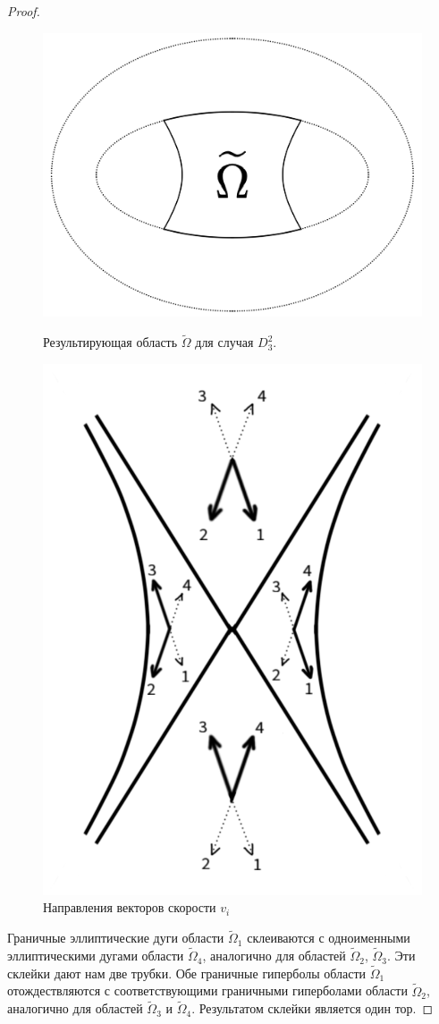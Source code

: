 \begin{proof}
\begin{figure}[!htb]
\centering
\includegraphics[width=0.8\linewidth]{images/section2/hyp_domain_example.pdf}
    \caption{Результирующая область $\widetilde{\Omega}$ для случая $D_3^2$.}
    \label{fig:pt9:_hyp_domain_example}
\endminipage\hfill
{}
\centering
\includegraphics[width=0.65\linewidth]{images/section2/hyp_vectors_numbering.pdf}
    \caption{Направления векторов скорости $v_i$}
    \label{fig:pt9:_hyp_vectors_numbering}
\endminipage\hfill
\end{figure}

Граничные эллиптические дуги области $\widetilde{\Omega}_1$ склеиваются с одноименными эллиптическими дугами области $\widetilde{\Omega}_4$, аналогично для областей $\widetilde{\Omega}_2$, $\widetilde{\Omega}_3$.
Эти склейки дают нам две трубки.
Обе граничные гиперболы области $\widetilde{\Omega}_1$ отождествляются с соответствующими граничными гиперболами области $\widetilde{\Omega}_2$, аналогично для областей $\widetilde{\Omega}_3$ и $\widetilde{\Omega}_4$. Результатом склейки является один тор.


\end{proof}
